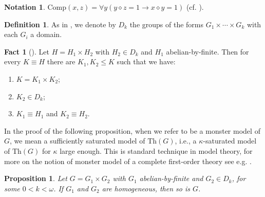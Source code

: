 \documentclass[a4paper, 11pt]{amsart}
\newtheorem{prop}[te]{Proposition}
\theoremstyle{definition}
\newtheorem{fact}[te]{Fact}
\newtheorem{notation}[te]{Notation}
\newtheorem{de}[te]{Definition}
\theoremstyle{remark}
\renewcommand{\leq}{\leqslant}
\begin{document}
	\begin{notation} 
	$\mathrm{Comp}(x,z) = \forall y (y \diamond z = 1 \rightarrow x \diamond y = 1)$ (cf. \cite[Proof of Lemma~4]{alg_geom_over_groups3}).
\end{notation}

	\begin{de}\label{Dk_notation} As in \cite{alg_geom_over_groups3}, we denote by $D_k$ the groups of the forms $G_1 \times \cdots \times G_k$ with each $G_i$ a domain.
\end{de}

	\begin{fact}[{\cite[Theorem~10.4]{AP24}}]\label{the_direct_dec_fact} Let $H = H_1 \times H_2$ with $H_2 \in D_k$ and $H_1$ abelian-by-finite. Then for every $K \equiv H$ there are $K_1, K_2 \leq K$ such that we have:
	\begin{enumerate}[(1)]
	\item $K = K_1 \times K_2$;
	\item $K_2 \in D_k$;
	\item $K_1 \equiv H_1$ and $K_2 \equiv H_2$. 
\end{enumerate}	
	\end{fact}

    In the proof of the following proposition, when we refer to be a monster model of $G$, we mean a sufficiently saturated model of $\mathrm{Th}(G)$, i.e., a $\kappa$-saturated model of $\mathrm{Th}(G)$ for $\kappa$ large enough. This is standard technique in model theory, for more on the notion of monster model of a complete first-order theory see e.g. \cite[pg.~218-219]{marker}.

\begin{prop}\label{hom_direct_prod} Let $G = G_1 \times G_2$ with $G_1$ abelian-by-finite and $G_2 \in D_k$, for some $0 < k < \omega$. If $G_1$ and $G_2$ are homogeneous, then so is $G$.
\end{prop}
\end{document}
